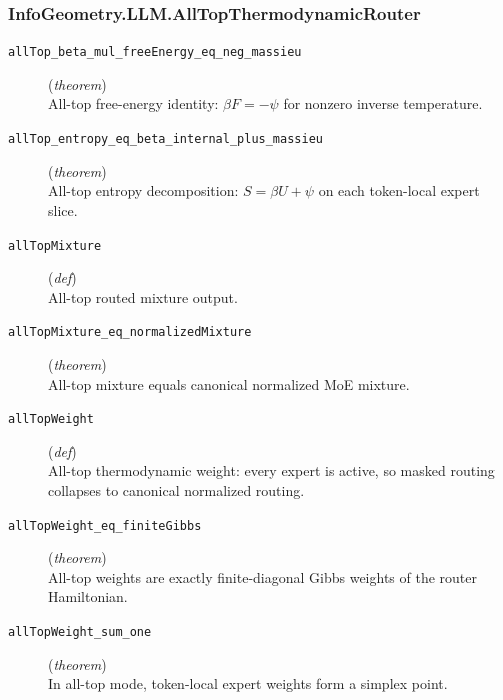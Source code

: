 \documentclass[11pt,a4paper]{article}
\begin{document}
\subsubsection*{InfoGeometry.LLM.AllTopThermodynamicRouter}
\begin{description}
  \item[\texttt{allTop\_beta\_mul\_freeEnergy\_eq\_neg\_massieu}] (\textit{theorem}) \\ All-top free-energy identity: 
$\beta F = -\psi $ for nonzero inverse temperature.
  \item[\texttt{allTop\_entropy\_eq\_beta\_internal\_plus\_massieu}] (\textit{theorem}) \\ All-top entropy decomposition: 
$S = \beta  U + \psi $ on each token-local expert slice.
  \item[\texttt{allTopMixture}] (\textit{def}) \\ All-top routed mixture output.
  \item[\texttt{allTopMixture\_eq\_normalizedMixture}] (\textit{theorem}) \\ All-top mixture equals canonical normalized MoE mixture.
  \item[\texttt{allTopWeight}] (\textit{def}) \\ All-top thermodynamic weight: 
every expert is active, so masked routing collapses to canonical normalized routing.
  \item[\texttt{allTopWeight\_eq\_finiteGibbs}] (\textit{theorem}) \\ All-top weights are exactly finite-diagonal Gibbs weights of the router Hamiltonian.
  \item[\texttt{allTopWeight\_sum\_one}] (\textit{theorem}) \\ In all-top mode, token-local expert weights form a simplex point.
\end{description}
\end{document}
